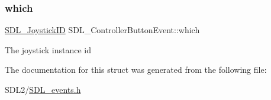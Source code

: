\subsubsection{\texorpdfstring{which}{which}}
{\footnotesize\ttfamily \hyperlink{_s_d_l__joystick_8h_a3c3d32500cb08f76ee8077983912c0bd}{S\+D\+L\+\_\+\+Joystick\+ID} S\+D\+L\+\_\+\+Controller\+Button\+Event\+::which}

The joystick instance id 

The documentation for this struct was generated from the following file\+:\begin{DoxyCompactItemize}
\item 
S\+D\+L2/\hyperlink{_s_d_l__events_8h}{S\+D\+L\+\_\+events.\+h}\end{DoxyCompactItemize}
